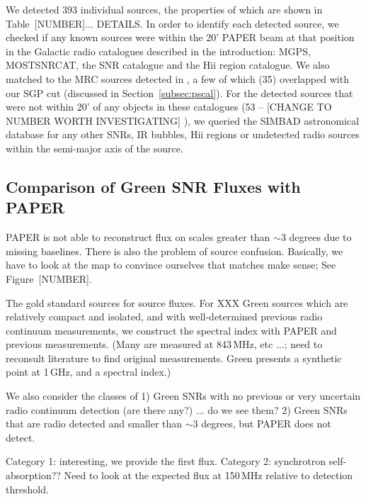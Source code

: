 \documentclass[useAMS,usenatbib]{mn2e}
\begin{document}
We detected $393$ individual sources, the properties of which are shown in Table~{\color{red}[NUMBER]... DETAILS}. In order to identify each detected source, we checked if any known sources were within the 20' PAPER beam at that position in the Galactic radio catalogues described in the introduction: MGPS, MOSTSNRCAT, the \cite{DAGreen.14} SNR catalogue and the \cite{Paladini.03} H{\sc ii} region catalogue. We also matched to the MRC sources detected in \cite{Jacobs.11}, a few of which (35) overlapped with our SGP cut (discussed in Section~\ref{subsec:pscal}). For the detected sources that were not within 20' of any objects in these catalogues (53 -- {\color{red}[CHANGE TO NUMBER WORTH INVESTIGATING]} ), we queried the SIMBAD astronomical database \citep{Wegner.00} for any other SNRs,  IR bubbles, H{\sc ii} regions or undetected radio sources within the semi-major axis of the source.

\subsection{Comparison of Green SNR Fluxes with PAPER}

PAPER is not able to reconstruct flux on scales greater than $\sim3$
degrees due to missing baselines.  There is also the problem of source
confusion.  Basically, we have to look at the map to convince
ourselves that matches make sense; See Figure~{\color{red}[NUMBER]}.

{\color{red} The gold standard sources for source fluxes.}
For XXX Green sources which are relatively compact
and isolated, and with well-determined previous radio continuum
measurements, we construct the spectral index with PAPER and previous
measurements.  (Many are measured at 843\,MHz, etc ...; need to
reconsult literature to find original measurements.  Green presents a
synthetic point at 1\,GHz, and a spectral index.)

We also consider the classes of 1) Green SNRs with no previous or very
uncertain radio continuum detection (are there any?) ... do we see
them?  2) Green SNRs that are radio detected and smaller than $\sim3$
degrees, but PAPER does not detect.

Category 1: interesting, we provide the first flux.  Category 2:
synchrotron self-absorption??  Need to look at the expected flux at
150\,MHz relative to detection threshold.  
\end{document}
